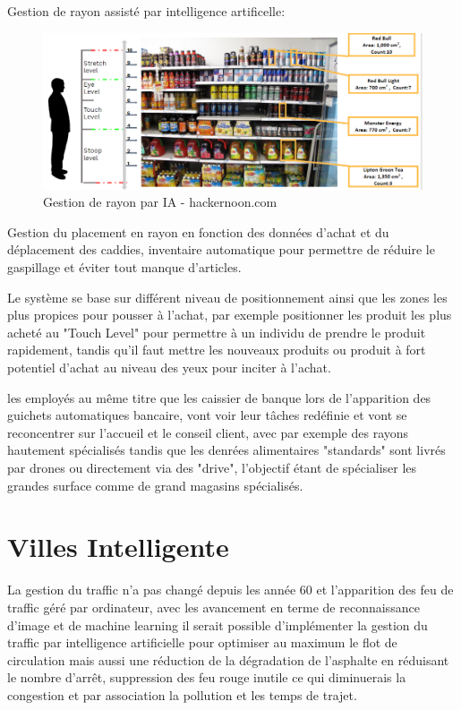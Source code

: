     Gestion de rayon assisté par intelligence artificelle: 
    
    \begin{figure}[H]
        \centering
        \includegraphics[width=1\textwidth]{Images/shelfAI}
        \caption{Gestion de rayon par IA - hackernoon.com }
        \label{fig:shelfAI}
    \end{figure}

    Gestion du placement en rayon en fonction des données d'achat et du déplacement 
    des caddies, inventaire automatique pour permettre de réduire 
    le gaspillage et éviter tout manque d'articles. \newline 

    Le système se base sur différent niveau de positionnement ainsi que les 
    zones les plus propices pour pousser à l'achat, par exemple 
    positionner les produit les plus acheté au "Touch Level" pour permettre 
    à un individu de prendre le produit rapidement, tandis qu'il faut mettre 
    les nouveaux produits ou produit à fort potentiel d'achat au niveau 
    des yeux pour inciter à l'achat. \newline 

    les employés au même titre que les caissier de banque lors de l'apparition
    des guichets automatiques bancaire, vont voir leur tâches redéfinie 
    et vont se reconcentrer sur l'accueil et le conseil client, avec 
    par exemple des rayons hautement spécialisés tandis que les denrées
    alimentaires "standards" sont livrés par drones ou directement via 
    des "drive", l'objectif étant de spécialiser les grandes surface 
    comme de grand magasins spécialisés. \newline 

    \section{Villes Intelligente}
    La gestion du traffic n'a pas changé depuis les année 60 
    et l'apparition des feu de traffic géré par ordinateur, avec 
    les avancement en terme de reconnaissance d'image et de machine learning 
    il serait possible d'implémenter la gestion du traffic par intelligence 
    artificielle pour optimiser au maximum le flot de circulation 
    mais aussi une réduction de la dégradation de l'asphalte en réduisant le 
    nombre d'arrêt, suppression des feu rouge inutile ce qui diminuerais 
    la congestion et par association la pollution et les temps de trajet. \newline
    
